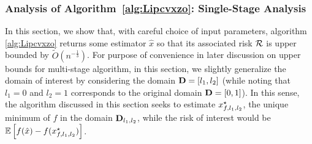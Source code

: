 \subsubsection{Analysis of Algorithm~\ref{alg:Lipcvxzo}: Single-Stage Analysis}
In this section, we show that, with careful choice of input parameters, algorithm 
\ref{alg:Lipcvxzo} returns some estimator $\hat{x}$ so that its associated risk 
$\mathcal{R}$ is upper bounded by $\tilde{O}\left(n^{-\frac{1}{3}}\right)$. For purpose 
of convenience in later discussion on upper bounds for multi-stage algorithm, 
in this section, we slightly generalize the domain of interest by considering the 
domain $\mathbf{D} = [l_1, l_2]$ (while noting that $l_1 = 0$ and $l_2 = 1$ 
corresponds to the original domain $\mathbf{D} = [0, 1]$). In this sense, 
the algorithm discussed in this section seeks to estimate $x_{f, l_1, l_2}^\star$, 
the unique minimum of $f$ in the domain $\mathbf{D}_{l_1, l_2}$, while the risk of 
interest would be $\mathbb{E} \left[f(\hat{x}) - f(x_{f, l_1, l_2}^\star)\right]$. 

